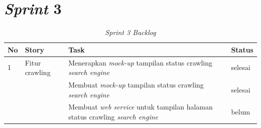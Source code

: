 \begin{enumerate}[label=\alph*)., leftmargin=1\parindent]
%	
\end{enumerate}


\section{\textit{Sprint} 3}

\begin{longtable}{@{}|p{0.5cm}|p{4cm}|p{6cm}|p{2cm}|@{}}
	\caption{\textit{Sprint 3 Backlog}}\\	
	\hline
	\textbf{No} & \textbf{Story} & \textbf{Task} & \textbf{Status} \\
	\hline
	1 & Fitur crawling & Menerapkan \textit{mock-up} tampilan status crawling \textit{search engine} & selesai \\
	\cline{3-4}
	& & Membuat \textit{mock-up} tampilan status crawling \textit{search engine} & selesai \\
	\cline{3-4}
	& & Membuat \textit{web service} untuk tampilan halaman status crawling \textit{search engine} & belum \\
	\cline{3-4}
	
\end{longtable}



